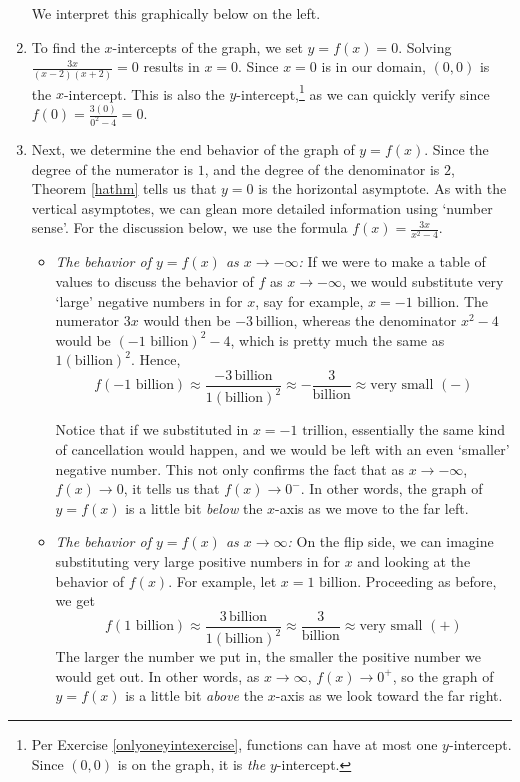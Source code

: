 \documentclass{ximera}
\begin{document}
\begin{ex}
\begin{enumerate}
We interpret this graphically below on the left.


\item  To find the $x$-intercepts of the graph, we set $y=f(x) = 0$.  Solving $ \frac{3x}{(x-2)(x+2)} = 0$ results in $x=0$.  Since $x=0$ is in our domain, $(0,0)$ is the $x$-intercept.   This is also the $y$-intercept,\footnote{Per Exercise \ref{onlyoneyintexercise}, functions can have at most one $y$-intercept. Since $(0,0)$ is on the graph,  it is \textit{the} $y$-intercept.} as we can quickly verify since $f(0) = \frac{3(0)}{0^2-4} = 0$.


\item  Next, we determine the end behavior of the graph of $y=f(x)$.  Since the degree of the numerator is $1$, and the degree of the denominator is $2$, Theorem \ref{hathm} tells us that $y=0$ is the horizontal asymptote.  As with the vertical asymptotes, we can glean more detailed information using `number sense'. For the discussion below, we use the formula $f(x) = \frac{3x}{x^2-4}$. 

\begin{itemize}

\item  \textit{The behavior of $y=f(x)$ as $x \rightarrow -\infty$:}  If we were to make a table of values to discuss the behavior of $f$ as $x \rightarrow -\infty$, we would substitute very `large' negative numbers in for $x$, say for example, $x = \text{$-1$ billion}$.  The numerator $3x$ would then be $-3 \, \text{billion}$, whereas the denominator $x^2-4$ would be $(\text{$-1$ billion})^2 - 4$, which is pretty much the same as  $1(\text{billion})^2$.  Hence, \[f\left(\text{$-1$ billion}\right) \approx \dfrac{-3 \, \text{billion}}{1(\text{billion})^2} \approx - \dfrac{3}{\text{billion}} \approx \text{very small $(-)$} \]

Notice that if we substituted in $x = \text{$-1$ trillion}$, essentially the same kind of cancellation would happen, and we would be left with an even `smaller' negative number.  This not only confirms the fact that as $x \rightarrow -\infty$, $f(x) \rightarrow 0$, it tells us that $f(x) \rightarrow 0^{-}$. In other words, the graph of $y=f(x)$ is a little bit \textit{below} the $x$-axis as we move to the far left.


\item  \textit{The behavior of $y=f(x)$ as $x \rightarrow \infty$:}  On the flip side, we can imagine substituting very large positive numbers in for $x$ and looking at the behavior of $f(x)$.   For example, let $x = \text{$1$ billion}$. Proceeding as before, we get \[f\left(\text{$1$ billion}\right) \approx \dfrac{3 \, \text{billion}}{1(\text{billion})^2} \approx \dfrac{3}{\text{billion}} \approx \text{very small $(+)$} \]  The larger the number we put in, the smaller the positive number we would get out.  In other words, as $x \rightarrow \infty$, $f(x) \rightarrow 0^{+}$, so the graph of $y=f(x)$ is a little bit \emph{above} the $x$-axis as we look toward the far right.  


\end{itemize}
\end{enumerate}
\end{ex}
\end{document}
